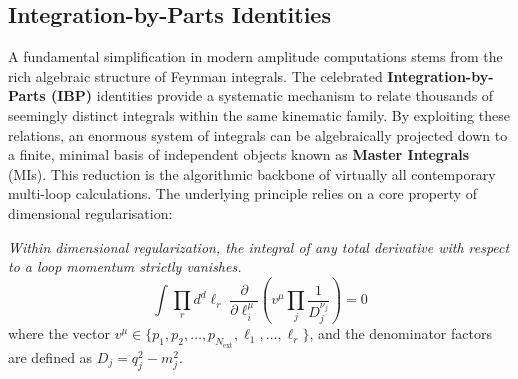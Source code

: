 \subsection*{Integration-by-Parts Identities}
A fundamental simplification in modern amplitude computations stems from the rich algebraic structure of Feynman integrals. The celebrated \textbf{Integration-by-Parts (IBP)} identities provide a systematic mechanism to relate thousands of seemingly distinct integrals within the same kinematic family. By exploiting these relations, an enormous system of integrals can be algebraically projected down to a finite, minimal basis of independent objects known as \textbf{Master Integrals} (MIs). This reduction is the algorithmic backbone of virtually all contemporary multi-loop calculations. The underlying principle relies on a core property of dimensional regularisation:
\begin{tcolorbox}[
  thesisstatementbox,
  title=Theorem,
  before skip=6pt,
  after skip=6pt,
  boxsep=2pt
]
\textit{Within dimensional regularization, the integral of any total derivative with respect to a loop momentum strictly vanishes.}
\begin{equation}
    \int \prod_{r} d^d\ell_r\;
    \frac{\partial}{\partial \ell_i^\mu}
    \left(
      v^\mu
      \prod_{j}\frac{1}{D_j^{\nu_j}}
    \right)=0
\end{equation}
where the vector $v^\mu\in\{p_1,p_2,\ldots,p_{N_{\mathrm{ext}}},\ell_1,\ldots,\ell_r\}$, and the denominator factors are defined as $D_j=q_j^2-m_j^2$.
\end{tcolorbox}

